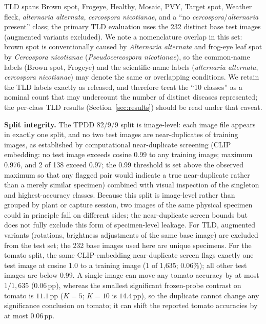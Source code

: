 \documentclass[10pt,a4paper]{article}
\begin{document}
TLD spans Brown spot, Frogeye, Healthy, Mosaic, PVY, Target spot, Weather fleck, \textit{alternaria alternata}, \textit{cercospora nicotianae}, and a ``no \textit{cercospora}/\textit{alternaria} present'' class; the primary TLD evaluation uses the 232 distinct base test images (augmented variants excluded). We note a nomenclature overlap in this set: brown spot is conventionally caused by \textit{Alternaria alternata} and frog-eye leaf spot by \textit{Cercospora nicotianae} (\textit{Pseudocercospora nicotianae}), so the common-name labels (Brown spot, Frogeye) and the scientific-name labels (\textit{alternaria alternata}, \textit{cercospora nicotianae}) may denote the same or overlapping conditions. We retain the TLD labels exactly as released, and therefore treat the ``10 classes'' as a nominal count that may undercount the number of distinct diseases represented; the per-class TLD results (Section~\ref{sec:results}) should be read under that caveat.

\textbf{Split integrity.} The TPDD 82/9/9 split is image-level: each image file appears in exactly one split, and no two test images are near-duplicates of training images, as established by computational near-duplicate screening (CLIP embedding: no test image exceeds cosine 0.99 to any training image; maximum 0.976, and 2 of 138 exceed 0.97; the 0.99 threshold is set above the observed maximum so that any flagged pair would indicate a true near-duplicate rather than a merely similar specimen) combined with visual inspection of the singleton and highest-accuracy classes. Because this split is image-level rather than grouped by plant or capture session, two images of the same physical specimen could in principle fall on different sides; the near-duplicate screen bounds but does not fully exclude this form of specimen-level leakage. For TLD, augmented variants (rotations, brightness adjustments of the same base image) are excluded from the test set; the 232 base images used here are unique specimens. For the tomato split, the same CLIP-embedding near-duplicate screen flags exactly one test image at cosine 1.0 to a training image (1 of 1{,}635; 0.06\%); all other test images are below 0.99. A single image can move any tomato accuracy by at most $1/1{,}635$ (0.06\,pp), whereas the smallest significant frozen-probe contrast on tomato is $11.1$\,pp ($K{=}5$; $K{=}10$ is $14.4$\,pp), so the duplicate cannot change any significance conclusion on tomato; it can shift the reported tomato accuracies by at most 0.06\,pp.
\end{document}

